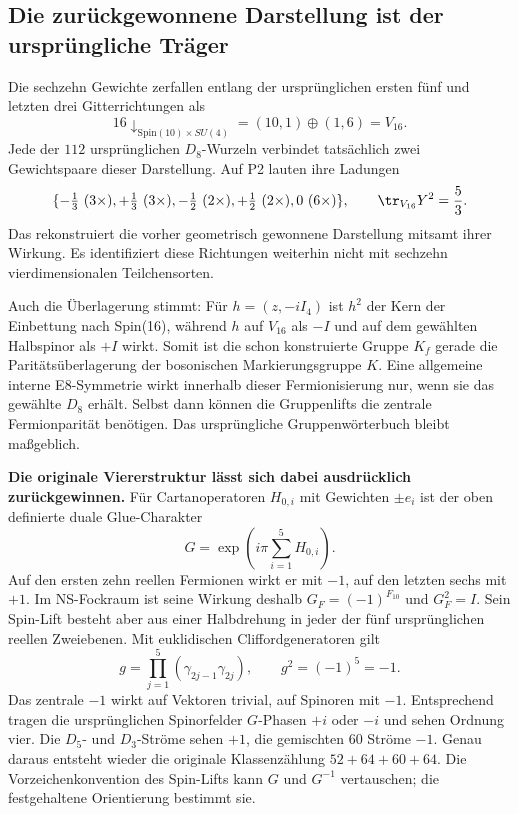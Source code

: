 \subsection{Die zurückgewonnene Darstellung ist der ursprüngliche Träger}
Die sechzehn Gewichte zerfallen entlang der ursprünglichen ersten fünf und letzten drei Gitterrichtungen als
\begin{equation}
16\downarrow_{\mathrm{Spin}(10)\times SU(4)}=(10,1)\oplus(1,6)=V_{16}.
\end{equation}
Jede der $112$ ursprünglichen $D_8$-Wurzeln verbindet tatsächlich zwei Gewichtspaare dieser Darstellung. Auf P2 lauten ihre Ladungen
\begin{equation}
\{-\tfrac13\ (3\times),+\tfrac13\ (3\times),
-\tfrac12\ (2\times),+\tfrac12\ (2\times),0\ (6\times)\},
\qquad \tr_{V_{16}}Y^2=\frac53.
\end{equation}
Das rekonstruiert die vorher geometrisch gewonnene Darstellung mitsamt ihrer Wirkung. Es identifiziert diese Richtungen weiterhin nicht mit sechzehn vierdimensionalen Teilchensorten.

Auch die Überlagerung stimmt: Für $h=(z,-iI_4)$ ist $h^2$ der Kern der Einbettung nach Spin(16), während $h$ auf $V_{16}$ als $-I$ und auf dem gewählten Halbspinor als $+I$ wirkt. Somit ist die schon konstruierte Gruppe $K_f$ gerade die Paritätsüberlagerung der bosonischen Markierungsgruppe $K$. Eine allgemeine interne E8-Symmetrie wirkt innerhalb dieser Fermionisierung nur, wenn sie das gewählte $D_8$ erhält. Selbst dann können die Gruppenlifts die zentrale Fermionparität benötigen. Das ursprüngliche Gruppenwörterbuch bleibt maßgeblich.

\textbf{Die originale Viererstruktur lässt sich dabei ausdrücklich zurückgewinnen.} Für Cartanoperatoren $H_{0,i}$ mit Gewichten $\pm e_i$ ist der oben definierte duale Glue-Charakter
\begin{equation}\label{eq:inverseinternalglue}
G=\exp\!\left(i\pi\sum_{i=1}^5H_{0,i}\right).
\end{equation}
Auf den ersten zehn reellen Fermionen wirkt er mit $-1$, auf den letzten sechs mit $+1$. Im NS-Fockraum ist seine Wirkung deshalb $G_F=(-1)^{F_{10}}$ und $G_F^2=I$. Sein Spin-Lift besteht aber aus einer Halbdrehung in jeder der fünf ursprünglichen reellen Zweiebenen. Mit euklidischen Cliffordgeneratoren gilt
\begin{equation}
g=\prod_{j=1}^5(\gamma_{2j-1}\gamma_{2j}),\qquad g^2=(-1)^5=-1.
\end{equation}
Das zentrale $-1$ wirkt auf Vektoren trivial, auf Spinoren mit $-1$. Entsprechend tragen die ursprünglichen Spinorfelder $G$-Phasen $+i$ oder $-i$ und sehen Ordnung vier. Die $D_5$- und $D_3$-Ströme sehen $+1$, die gemischten $60$ Ströme $-1$. Genau daraus entsteht wieder die originale Klassenzählung $52+64+60+64$. Die Vorzeichenkonvention des Spin-Lifts kann $G$ und $G^{-1}$ vertauschen; die festgehaltene Orientierung bestimmt sie.

